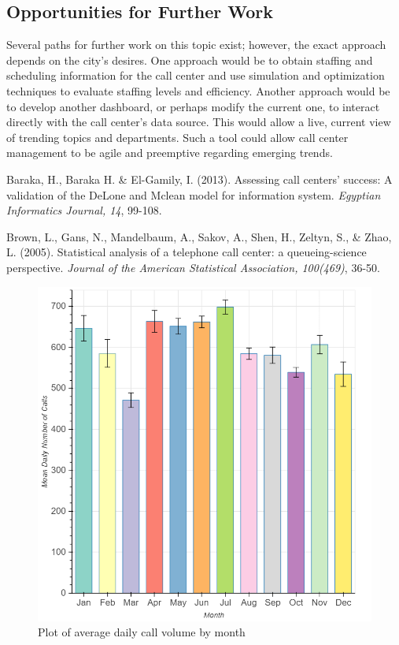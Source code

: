 \documentclass{article}
\begin{document}
	\subsection{Opportunities for Further Work}

Several paths for further work on this topic exist; however, the exact approach depends on the city's desires.  One approach would be to obtain staffing and scheduling information for the call center and use simulation and optimization techniques to evaluate staffing levels and efficiency.  Another approach would be to develop another dashboard, or perhaps modify the current one, to interact directly with the call center's data source.  This would allow a live, current view of trending topics and departments.  Such a tool could allow call center management to be agile and preemptive regarding emerging trends.



\begin{thebibliography}{2}

Baraka, H., Baraka H. \& El-Gamily, I. (2013). Assessing call centers' success: A validation of the DeLone and Mclean model for information system. \textit{Egyptian Informatics Journal, 14}, 99-108.

Brown, L., Gans, N., Mandelbaum, A., Sakov, A., Shen, H., Zeltyn, S., \& Zhao, L. (2005). Statistical analysis of a telephone call center: a queueing-science perspective. \textit{Journal of the American Statistical Association, 100(469)}, 36-50.

\end{thebibliography}
\newpage

\begin{figure}[p]
  \includegraphics[scale=.27]{month_bar.png}
  \caption{Plot of average daily call volume by month}
\end{figure}
\end{document}
